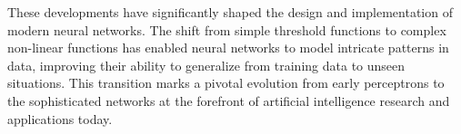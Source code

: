 These developments have significantly shaped the design and implementation of modern neural networks. The shift from simple threshold functions to complex
non-linear functions has enabled neural networks to model intricate patterns in data, improving their ability to generalize from training data to unseen situations.
This transition marks a pivotal evolution from early perceptrons to the sophisticated networks at the forefront of artificial intelligence research and applications today.









